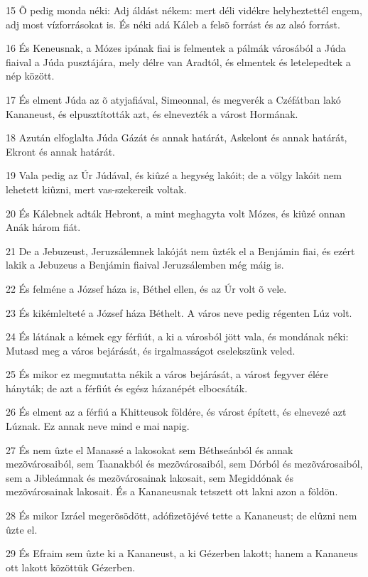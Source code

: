 \par 15 Õ pedig monda néki: Adj áldást nékem: mert déli vidékre helyheztettél engem, adj most vízforrásokat is. És néki adá Káleb a felsõ forrást és az alsó forrást.
\par 16 És Keneusnak, a Mózes ipának fiai is felmentek a pálmák városából a Júda fiaival a Júda pusztájára, mely délre van Aradtól, és elmentek és letelepedtek a nép között.
\par 17 És elment Júda az õ atyjafiával, Simeonnal, és megverék a Czéfátban lakó Kananeust, és elpusztították azt, és elnevezték a várost Hormának.
\par 18 Azután elfoglalta Júda Gázát és annak határát, Askelont és annak határát, Ekront és annak határát.
\par 19 Vala pedig az Úr Júdával, és kiûzé a hegység lakóit; de a völgy lakóit nem lehetett kiûzni, mert vas-szekereik voltak.
\par 20 És Kálebnek adták Hebront, a mint meghagyta volt Mózes, és kiûzé onnan Anák három fiát.
\par 21 De a Jebuzeust, Jeruzsálemnek lakóját nem ûzték el a Benjámin fiai, és ezért lakik a Jebuzeus a Benjámin fiaival Jeruzsálemben még máig is.
\par 22 És felméne a József háza is, Béthel ellen, és az Úr volt õ vele.
\par 23 És kikémlelteté a József háza Béthelt. A város neve pedig régenten Lúz volt.
\par 24 És látának a kémek egy férfiút, a ki a városból jött vala, és mondának néki: Mutasd meg a város bejárását, és irgalmasságot cselekszünk veled.
\par 25 És mikor ez megmutatta nékik a város bejárását, a várost fegyver élére hányták; de azt a férfiút és egész házanépét elbocsáták.
\par 26 És elment az a férfiú a Khitteusok földére, és várost épített, és elnevezé azt Lúznak. Ez annak neve mind e mai napig.
\par 27 És nem ûzte el Manassé a lakosokat sem Béthseánból és annak mezõvárosaiból, sem Taanakból és mezõvárosaiból, sem Dórból és mezõvárosaiból, sem a Jibleámnak és mezõvárosainak lakosait, sem Megiddónak és mezõvárosainak lakosait. És a Kananeusnak tetszett ott lakni azon a földön.
\par 28 És mikor Izráel megerõsödött, adófizetõjévé tette a Kananeust; de elûzni nem ûzte el.
\par 29 És Efraim sem ûzte ki a Kananeust, a ki Gézerben lakott; hanem a Kananeus ott lakott közöttük Gézerben.
